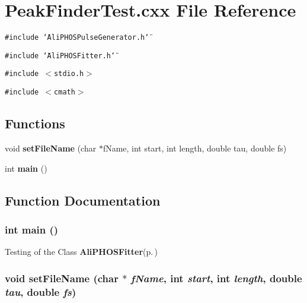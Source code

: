 \section{Peak\-Finder\-Test.cxx File Reference}
\label{PeakFinderTest_8cxx}
{\tt \#include \char`\"{}Ali\-PHOSPulse\-Generator.h\char`\"{}}\par
{\tt \#include \char`\"{}Ali\-PHOSFitter.h\char`\"{}}\par
{\tt \#include $<$stdio.h$>$}\par
{\tt \#include $<$cmath$>$}\par
\subsection*{Functions}
\begin{CompactItemize}
\item 
void {\bf set\-File\-Name} (char $\ast$f\-Name, int start, int length, double tau, double fs)
\item 
int {\bf main} ()
\end{CompactItemize}


\subsection{Function Documentation}
\subsubsection{\setlength{\rightskip}{0pt plus 5cm}int main ()}\label{PeakFinderTest_8cxx_a1}


Testing of the Class {\bf Ali\-PHOSFitter}{\rm (p.\,\pageref{classAliPHOSFitter})} 
\subsubsection{\setlength{\rightskip}{0pt plus 5cm}void set\-File\-Name (char $\ast$ {\em f\-Name}, int {\em start}, int {\em length}, double {\em tau}, double {\em fs})}\label{PeakFinderTest_8cxx_a0}


